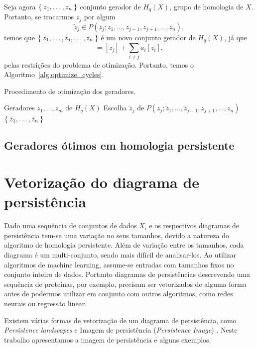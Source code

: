 Seja agora $\Set{z_1, \dots, z_n}$ conjunto gerador de $H_q(X)$, grupo de homologia
de $X$. Portanto, se trocarmos $z_j$ por algum
\begin{equation*}
    \tilde{z}_j \in P(z_j; z_1, \dots, z_{j-1}, z_{j+1}, \dots, z_n),
\end{equation*}
temos que $\Set{z_1, \dots, \tilde{z}_j, \dots, z_n}$ é um novo conjunto gerador 
de $H_q(X)$, já que 
\begin{equation*}
    [\tilde{z}_j] = [z_j] + \sum_{i\neq j} a_i [z_i],
\end{equation*}
pelas restrições do problema de otimização. Portanto, temos o Algoritmo~\ref{alg:optimize_cycles}.
\begin{algoritmo}[!htpb]
  \caption{Procedimento de otimização dos geradores.}
  \label{alg:optimize_cycles}
  \begin{algorithmic}[1]
    \Require Geradores $z_1, \dots, z_m$ de $H_q(X)$
        \State Escolha $\tilde{z}_j$ de $P(z_j; \tilde{z}_1, \dots,
         \tilde{z}_{j-1}, z_{j+1}, \dots, z_n)$
    \EndFor    
    \State \Return $\Set{\tilde{z}_1, \dots, \tilde{z}_n}$
    \EndFunction
  \end{algorithmic}
\end{algoritmo}


\subsection{Geradores ótimos em homologia persistente}


\section{Vetorização do diagrama de persistência}
Dado uma sequência de conjuntos de dados $X_i$ e os respectivos diagramas de persistência tem-se uma variação no
seus tamanhos, devido a natureza do algoritmo de homologia persistente. Além de variação entre os tamanhos, cada 
diagrama é um multi-conjunto, sendo mais difícil de analisar-los. Ao utilizar algoritmos de machine learning, 
assume-se entradas com tamanhos fixos no conjunto inteiro de dados. Portanto diagramas de persistências descrevendo
uma sequência de proteínas, por exemplo, precisam ser vetorizados de alguma forma antes de podermos utilizar em
conjunto com outros algoritmos, como redes neurais ou regressão linear. 

Existem várias formas de vetorização de um diagrama de persistência, como \textit{Persistence landscapes}
\cite{bubenik15a} e Imagem de persistência (\textit{Persistence Image}) \cite{Adams2017}. Neste trabalho apresentamos
a imagem de persistência e alguns exemplos.

